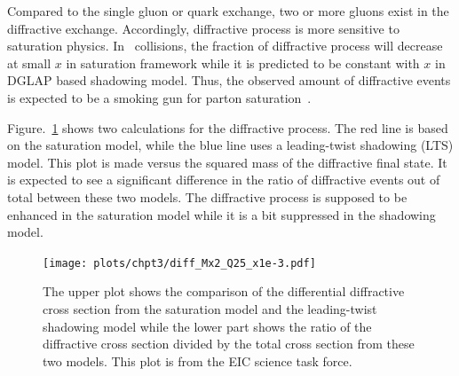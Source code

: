 Compared to the single gluon or quark exchange, two or more gluons exist in the
diffractive exchange. Accordingly, diffractive process is more sensitive to
saturation physics. In \eA\ collisions, the fraction of diffractive process will
decrease at small $x$ in saturation framework while it is predicted to be constant
with $x$ in DGLAP based shadowing model. Thus, the observed amount of
diffractive events is expected to be a smoking gun for parton
saturation~\cite{Kowalski:2008sa}.

Figure.~\ref{fig:diff_eA} shows two calculations for the diffractive process.
The red line is based on the saturation model, while the blue line uses a
leading-twist shadowing (LTS) model. This plot is made versus the squared mass
of the diffractive final state. It is expected to see a significant difference
in the ratio of diffractive events out of total between these two models. The
diffractive process is supposed to be enhanced in the saturation model while it
is a bit suppressed in the shadowing model.
\begin{figure}
\centering
\texttt{[image: plots/chpt3/diff\_Mx2\_Q25\_x1e-3.pdf]}
\caption[Diffractive cross section ratio]{
The upper plot shows the comparison of the differential diffractive cross section from the saturation model and the leading-twist shadowing model while the lower part shows the ratio of the diffractive cross section divided by the total cross section from these two models. This plot is from the EIC science task force.}
\label{fig:diff_eA}
\end{figure}


